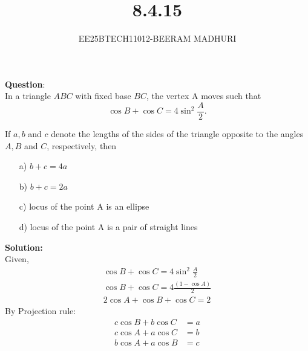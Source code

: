 \documentclass[journal]{IEEEtran}
\begin{document}

\vspace{3cm}

\title{8.4.15}
\author{EE25BTECH11012-BEERAM MADHURI}
{\let\newpage\relax\maketitle}

\renewcommand{\thefigure}{\theenumi}
\renewcommand{\thetable}{\theenumi}
\setlength{\intextsep}{10pt} %


\renewcommand{\thetable}{\theenumi}


\textbf{Question}:\\
In a triangle $ABC$ with fixed base $BC$, the vertex A moves such that
\[\cos B + \cos C = 4 \sin^2 \frac{A}{2}.\]

If $a, b$ and $c$ denote the lengths of the sides of the triangle opposite to the angles $A, B$ and $C$, respectively, then

\begin{enumerate}
    \item[a)] $b + c = 4a$
    \item[b)] $b + c = 2a$
    \item[c)] locus of the point A is an ellipse
    \item[d)] locus of the point A is a pair of straight lines
\end{enumerate}
\textbf{Solution:}\\
Given,
\begin{align}
\cos B + \cos C = 4 \sin^2 \frac{A}{2}\\
\cos B + \cos C = 4 \frac{(1 - \cos A)}{2}\\
2 \cos A + \cos B + \cos C = 2
\end{align}
By Projection rule:
\begin{align}c \cos B + b \cos C &= a \\c \cos A + a \cos C &= b \\b \cos A + a \cos B &= c\end{align}
\end{document}
